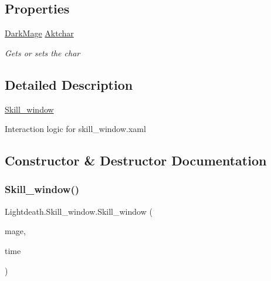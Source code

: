 \subsection*{Properties}
\begin{DoxyCompactItemize}
\item 
\hyperlink{class_lightdeath_1_1_dark_mage}{Dark\+Mage} \hyperlink{class_lightdeath_1_1_skill__window_af9797b39af22bd8f22dd4173fda52808}{Aktchar}
\begin{DoxyCompactList}\small\item\em Gets or sets the char \end{DoxyCompactList}\end{DoxyCompactItemize}


\subsection{Detailed Description}
\hyperlink{class_lightdeath_1_1_skill__window}{Skill\+\_\+window} 

Interaction logic for skill\+\_\+window.\+xaml 

\subsection{Constructor \& Destructor Documentation}
\hypertarget{class_lightdeath_1_1_skill__window_a5c88e8a767b1897ea475d92b44ef79b7}{}\label{class_lightdeath_1_1_skill__window_a5c88e8a767b1897ea475d92b44ef79b7} 
\subsubsection{\texorpdfstring{Skill\+\_\+window()}{Skill\_window()}}
{\footnotesize\ttfamily Lightdeath.\+Skill\+\_\+window.\+Skill\+\_\+window (\begin{DoxyParamCaption}\item[{\hyperlink{class_lightdeath_1_1_dark_mage}{Dark\+Mage}}]{mage,  }\item[{Dispatcher\+Timer}]{time }\end{DoxyParamCaption})\hspace{0.3cm}{\ttfamily [inline]}}



